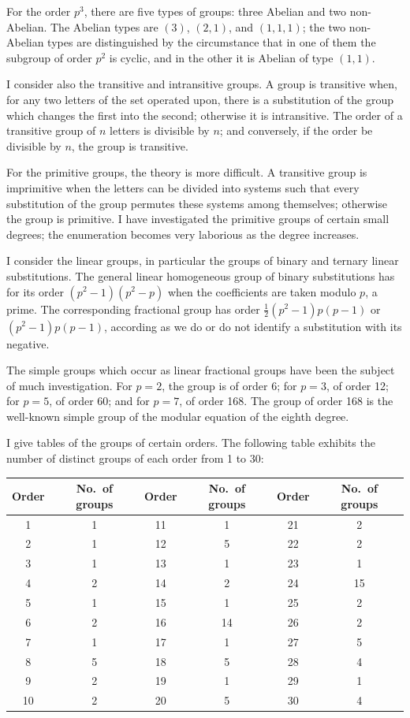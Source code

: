 \documentclass[11pt,a4paper]{article}
\theoremstyle{plain}
\theoremstyle{definition}
\begin{document}
For the order $p^3$, there are five types of groups: three Abelian and two non-Abelian. The Abelian types are $(3)$, $(2,1)$, and $(1,1,1)$; the two non-Abelian types are distinguished by the circumstance that in one of them the subgroup of order $p^2$ is cyclic, and in the other it is Abelian of type $(1,1)$.

I consider also the transitive and intransitive groups. A group is transitive when, for any two letters of the set operated upon, there is a substitution of the group which changes the first into the second; otherwise it is intransitive. The order of a transitive group of $n$ letters is divisible by $n$; and conversely, if the order be divisible by $n$, the group is transitive.

For the primitive groups, the theory is more difficult. A transitive group is imprimitive when the letters can be divided into systems such that every substitution of the group permutes these systems among themselves; otherwise the group is primitive. I have investigated the primitive groups of certain small degrees; the enumeration becomes very laborious as the degree increases.

I consider the linear groups, in particular the groups of binary and ternary linear substitutions. The general linear homogeneous group of binary substitutions has for its order $(p^2-1)(p^2-p)$ when the coefficients are taken modulo $p$, a prime. The corresponding fractional group has order $\tfrac12(p^2-1)p(p-1)$ or $(p^2-1)p(p-1)$, according as we do or do not identify a substitution with its negative.

The simple groups which occur as linear fractional groups have been the subject of much investigation. For $p=2$, the group is of order 6; for $p=3$, of order 12; for $p=5$, of order 60; and for $p=7$, of order 168. The group of order 168 is the well-known simple group of the modular equation of the eighth degree.

I give tables of the groups of certain orders. The following table exhibits the number of distinct groups of each order from 1 to 30:

\begin{center}
\begin{tabular}{|c|c||c|c||c|c|}
\hline
Order & No.\ of groups & Order & No.\ of groups & Order & No.\ of groups \\
\hline
1 & 1 & 11 & 1 & 21 & 2 \\
2 & 1 & 12 & 5 & 22 & 2 \\
3 & 1 & 13 & 1 & 23 & 1 \\
4 & 2 & 14 & 2 & 24 & 15 \\
5 & 1 & 15 & 1 & 25 & 2 \\
6 & 2 & 16 & 14 & 26 & 2 \\
7 & 1 & 17 & 1 & 27 & 5 \\
8 & 5 & 18 & 5 & 28 & 4 \\
9 & 2 & 19 & 1 & 29 & 1 \\
10 & 2 & 20 & 5 & 30 & 4 \\
\hline
\end{tabular}
\end{center}
\end{document}
